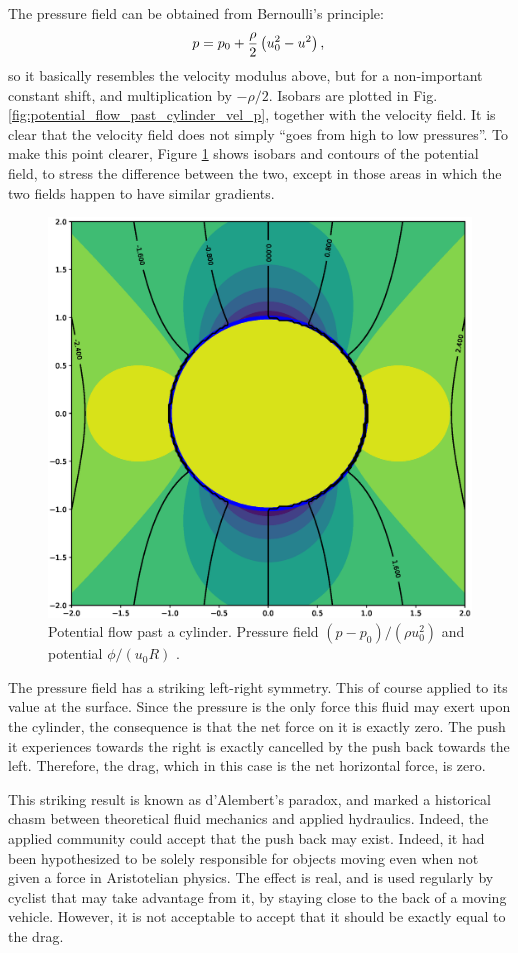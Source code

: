 The pressure field can be obtained from Bernoulli's principle:
%
\begin{equation*}
p = p_0 +  \frac{\rho}2  \left(u_0^2 - u^2 \right)  ,\\
\end{equation*}
so it basically resembles the velocity modulus above, but for
a non-important constant shift, and multiplication by $-\rho/2$.
Isobars are plotted in Fig. \ref{fig:potential_flow_past_cylinder_vel_p}, together
with the velocity field. It is clear that the velocity field does not simply ``goes from high to low pressures''.
To make this point clearer, Figure \ref{fig:potential_flow_past_cylinder_phi_p} 
shows isobars and contours of the potential field, to stress the difference between the
two, except in those areas in which the two fields happen to
have similar gradients.

\begin{figure}
  \centering
  \includegraphics[width=0.4\linewidth]{figures/potential_flow_past_cylinder_phi_p}
  \caption{	Potential flow past a cylinder. Pressure field $ (p-p_0)/(\rho u_0^2)$
  and potential $\phi / (u_0 R)	$ .
  	\label{fig:potential_flow_past_cylinder_phi_p}}
\end{figure}

The pressure field has a striking left-right symmetry. This of course
applied to its value at the surface. Since the pressure is the only
force this fluid may exert upon the cylinder, the consequence is that
the net force on it is exactly zero. The push it experiences towards
the right is exactly cancelled by the push back towards the
left. Therefore, the drag, which in this case is the net horizontal
force, is zero.

This striking result is known as d'Alembert's paradox, and marked a
historical chasm between theoretical fluid mechanics and applied
hydraulics. Indeed, the applied community could accept that the push
back may exist. Indeed, it had been hypothesized to be solely
responsible for objects moving even when not given a force in
Aristotelian physics. The effect is real, and is used regularly by
cyclist that may take advantage from it, by staying close to the back
of a moving vehicle. However, it is not acceptable to accept that it
should be exactly equal to the drag.

